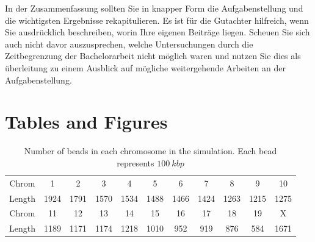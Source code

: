 \documentclass[a4paper,11pt,oneside,final,english,toc=bib,draft]{scrbook}
\begin{document}
In der Zusammenfassung sollten Sie in knapper Form die Aufgabenstellung 
und die wichtigsten Ergebnisse rekapitulieren. Es ist für die 
Gutachter hilfreich, wenn Sie ausdrücklich beschreiben, worin 
Ihre eigenen Beiträge liegen. Scheuen Sie sich auch nicht davor 
auszusprechen, welche Untersuchungen durch die Zeitbegrenzung der 
Bachelorarbeit nicht möglich waren und nutzen Sie dies als 
überleitung zu einem Ausblick auf mögliche weitergehende 
Arbeiten an der Aufgabenstellung.


\printbibliography

\appendix

\chapter{Tables and Figures} %
\label{cha:tables_and_figures}

\medskip

\begin{table}[H]
\centering
  \caption{Number of beads in each chromosome in the simulation. Each bead represents \(\SI{100}{kbp}\)}
  \label{tab:chrom_lengths}
  \begin{tabular}{c c c c c c c c c c c}
   \toprule
    Chrom & 1 & 2 & 3 & 4 & 5 & 6 & 7 & 8 & 9 & 10 \\
    Length & 1924 & 1791 & 1570 & 1534 & 1488 & 1466 & 1424 & 1263 & 1215 & 1275 \\
  \midrule
    Chrom & 11 & 12 & 13 & 14 & 15 & 16 & 17 & 18 & 19 & X \\
    Length & 1189 & 1171 & 1174 & 1218 & 1010 & 952 & 919 & 876 & 584 & 1671 \\
  \bottomrule
  \end{tabular}
\end{table}
\end{document}
